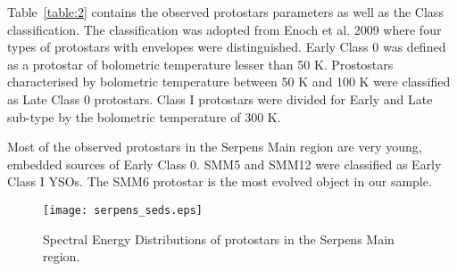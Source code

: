 \documentclass{aa}
\begin{document}
Table~\ref{table:2} contains the observed protostars parameters as well as the Class classification. The classification was adopted from Enoch et al. 2009 where four types of protostars with envelopes were distinguished. Early Class 0 was defined as a protostar of bolometric temperature lesser than 50 K. Prostostars characterised by bolometric temperature between 50 K and 100 K were classified as Late Class 0 protostars. Class I protostars were divided for Early and Late sub-type by the bolometric temperature of 300 K.

Most of the observed protostars in the Serpens Main region are very young, embedded sources of Early Class 0. SMM5 and SMM12 were classified as Early Class I YSOs. The SMM6 protostar is the most evolved object in our sample. 

\begin{figure}
   \texttt{[image: serpens\_seds.eps]}
      \caption{Spectral Energy Distributions of protostars in the Serpens Main region.}
         \label{seds}
   \end{figure}
\end{document}
